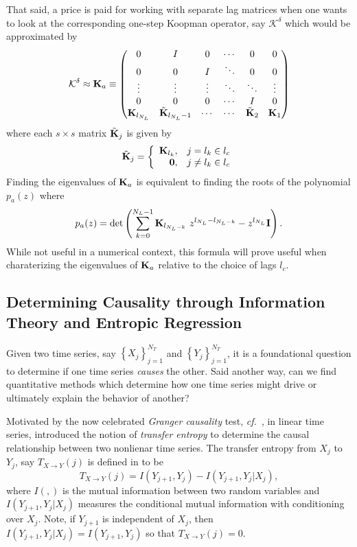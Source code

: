 \documentclass[a4paper,11pt]{article}
\newcommand{\ba}{\begin{array}}
\newcommand{\ea}{\end{array}}
\newcommand{\cf}{{\it cf.}~}
\begin{document}
That said, a price is paid for working with separate lag matrices when one wants to look at the corresponding one-step Koopman operator, say $\mathcal{K}^{\delta}$ which would be approximated by
\begin{equation}
\mathcal{K}^{\delta} \approx {\bf K}_{a} \equiv 
\begin{pmatrix} 
0 & I & 0 & \cdots & 0 & 0 \\ 
0 & 0 & I & \ddots & 0 & 0 \\ 
\vdots & \vdots & \vdots & \ddots & \ddots & \vdots \\
0 & 0 & 0 & \cdots & I & 0 \\
{\bf K}_{l_{N_{L}}} & \tilde{{\bf K}}_{l_{N_{L}}-1} & \cdots & \cdots & \tilde{{\bf K}}_{2} & {\bf K}_{1} 
\end{pmatrix}
\label{full_matrix}
\end{equation}
where each $s\times s$ matrix $\tilde{{\bf K}}_{j}$ is given by 
\[
\tilde{{\bf K}}_{j} = \left\{
\ba{rl}  
{\bf K}_{l_{k}}, & j=l_{k}\in l_{c}\\
{\bf 0}, & j\neq l_{k}\in l_{c}
\ea
\right.
\]
Finding the eigenvalues of ${\bf K}_{a}$ is equivalent to finding the roots of the polynomial $p_{a}(z)$ where 
\begin{equation}
p_{a}(z) = \text{det}\left(\sum_{k=0}^{N_{L}-1}{\bf K}_{l_{N_{L}-k}}~z^{l_{N_{L}}-l_{N_{L}-k}} - z^{l_{N_{L}}}{\bf I} \right). 
\label{characpoly}
\end{equation}
While not useful in a numerical context, this formula will prove useful when charaterizing the eigenvalues of ${\bf K}_{a}$ relative to the choice of lags $l_{c}$.  
\subsection{Determining Causality through Information Theory and Entropic Regression}

Given two time series, say $\left\{X_{j}\right\}_{j=1}^{N_{T}}$ and $\left\{Y_{j}\right\}_{j=1}^{N_{T}}$, it is a foundational question to determine if one time series {\it causes} the other.  Said another way, can we find quantitative methods which determine how one time series might drive or ultimately explain the behavior of another?  

Motivated by the now celebrated {\it Granger causality} test, \cf \cite{granger}, in linear time series, \cite{schreiber} introduced the notion of {\it transfer entropy} to determine the causal relationship between two nonlienar time series.  The transfer entropy from $X_{j}$ to $Y_{j}$, say $T_{X\rightarrow Y}(j)$ is defined in \cite{schreiber} to be 
\[
T_{X\rightarrow Y}(j) = I(Y_{j+1},Y_{j}) - I(Y_{j+1},Y_{j}|X_{j}),  
\]
where $I(,)$ is the mutual information between two random variables and $I(Y_{j+1},Y_{j}|X_{j})$ measures the conditional mutual information with conditioning over $X_{j}$.  Note, if $Y_{j+1}$ is independent of $X_{j}$, then $I(Y_{j+1},Y_{j}|X_{j}) = I(Y_{j+1},Y_{j})$ so that $T_{X\rightarrow Y}(j) = 0$.  
\end{document}

